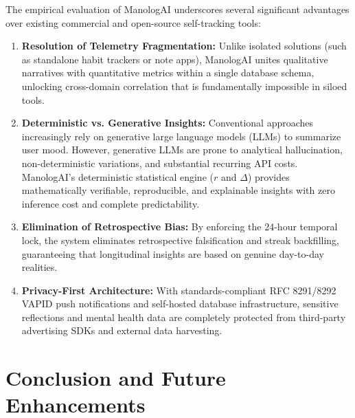 The empirical evaluation of ManologAI underscores several significant advantages over existing commercial and open-source self-tracking tools:
\begin{enumerate}
  \item \textbf{Resolution of Telemetry Fragmentation:} Unlike isolated solutions (such as standalone habit trackers or note apps), ManologAI unites qualitative narratives with quantitative metrics within a single database schema, unlocking cross-domain correlation that is fundamentally impossible in siloed tools.
  \item \textbf{Deterministic vs. Generative Insights:} Conventional approaches increasingly rely on generative large language models (LLMs) to summarize user mood. However, generative LLMs are prone to analytical hallucination, non-deterministic variations, and substantial recurring API costs. ManologAI's deterministic statistical engine ($r$ and $\Delta$) provides mathematically verifiable, reproducible, and explainable insights with zero inference cost and complete predictability.
  \item \textbf{Elimination of Retrospective Bias:} By enforcing the 24-hour temporal lock, the system eliminates retrospective falsification and streak backfilling, guaranteeing that longitudinal insights are based on genuine day-to-day realities.
  \item \textbf{Privacy-First Architecture:} With standards-compliant RFC 8291/8292 VAPID push notifications and self-hosted database infrastructure, sensitive reflections and mental health data are completely protected from third-party advertising SDKs and external data harvesting.
\end{enumerate}

\section{Conclusion and Future Enhancements}

